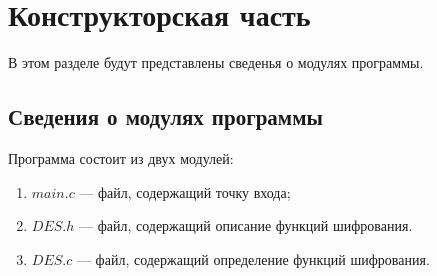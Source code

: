 \chapter{Конструкторская часть}
В этом разделе будут представлены сведенья о модулях программы.

\section{Сведения о модулях программы}
Программа состоит из двух модулей:
\begin{enumerate}[label=\arabic*)]
    \item $main.c$ --- файл, содержащий точку входа;
    \item $DES.h$ --- файл, содержащий описание функций шифрования.
    \item $DES.c$ --- файл, содержащий определение функций шифрования.
\end{enumerate}

